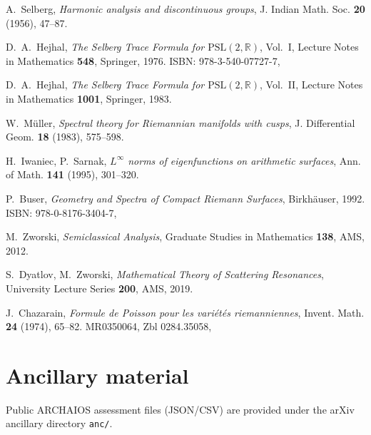 \documentclass[12pt]{amsart}
\numberwithin{equation}{section}
\theoremstyle{plain}
\theoremstyle{definition}
\theoremstyle{remark}
\begin{document}
\begin{thebibliography}{99}

A.~Selberg,
\textit{Harmonic analysis and discontinuous groups},
J. Indian Math. Soc. \textbf{20} (1956), 47--87.

D.~A.~Hejhal,
\textit{The Selberg Trace Formula for $\mathrm{PSL}(2,\mathbb{R})$}, Vol.~I,
Lecture Notes in Mathematics \textbf{548}, Springer, 1976.
ISBN: 978-3-540-07727-7, 

D.~A.~Hejhal,
\textit{The Selberg Trace Formula for $\mathrm{PSL}(2,\mathbb{R})$}, Vol.~II,
Lecture Notes in Mathematics \textbf{1001}, Springer, 1983.

W.~M\"uller,
\textit{Spectral theory for Riemannian manifolds with cusps},
J. Differential Geom. \textbf{18} (1983), 575--598.

H.~Iwaniec, P.~Sarnak,
\textit{$L^\infty$ norms of eigenfunctions on arithmetic surfaces},
Ann. of Math. \textbf{141} (1995), 301--320.

P.~Buser,
\textit{Geometry and Spectra of Compact Riemann Surfaces},
Birkh\"auser, 1992.
ISBN: 978-0-8176-3404-7, 

M.~Zworski,
\textit{Semiclassical Analysis},
Graduate Studies in Mathematics \textbf{138}, AMS, 2012.

S.~Dyatlov, M.~Zworski,
\textit{Mathematical Theory of Scattering Resonances},
University Lecture Series \textbf{200}, AMS, 2019.

J.~Chazarain,
\textit{Formule de Poisson pour les vari\'et\'es riemanniennes},
Invent. Math. \textbf{24} (1974), 65--82.
MR0350064, Zbl 0284.35058, 

\end{thebibliography}

\section*{Ancillary material}
Public ARCHAIOS assessment files (JSON/CSV) are provided under the arXiv ancillary directory \texttt{anc/}.
\end{document}
